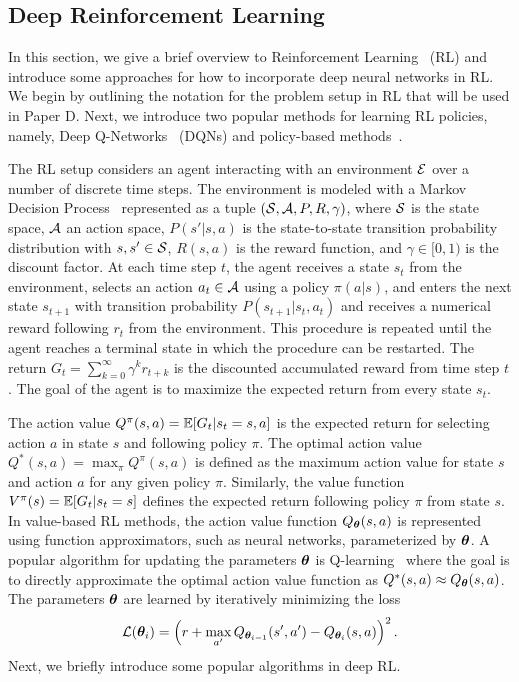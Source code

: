 \subsection{Deep Reinforcement Learning}\label{sec:deep_rl}

In this section, we give a brief overview to Reinforcement Learning~\cite{sutton2018reinforcement} (RL) and introduce some approaches for how to incorporate deep neural networks in RL. We begin by outlining the notation for the problem setup in RL that will be used in Paper D. Next, we introduce two popular methods for learning RL policies, namely, Deep Q-Networks~\cite{mnih2013playing, mnih2015human} (DQNs) and policy-based methods~\cite{mnih2016asynchronous, schulman2017proximal}. 

The RL setup considers an agent interacting with an environment ${\mathcal{E}}$ over a number of discrete time steps. The environment is modeled with a Markov Decision Process~\cite{bellman1957markovian} represented as a tuple $({\mathcal{S}}, {\mathcal{A}}, P, R, \gamma)$, where ${\mathcal{S}}$ is the state space, ${\mathcal{A}}$ an action space, $P(s' | s, a)$ is the state-to-state transition probability distribution with $s, s' \in {\mathcal{S}}$, $R(s, a)$ is the reward function, and $\gamma \in [0, 1)$ is the discount factor. At each time step $t$, the agent receives a state $s_t$ from the environment, selects an action $a_t \in {\mathcal{A}}$ using a policy $\pi(a | s)$, and enters the next state $s_{t+1}$ with transition probability $P(s_{t+1} | s_t, a_t)$ and receives a numerical reward following $r_t$ from the environment. This procedure is repeated until the agent reaches a terminal state in which the procedure can be restarted. The return $G_t = \sum_{k=0}^{\infty} \gamma^{k} r_{t+k}$ is the discounted accumulated reward from time step $t$. The goal of the agent is to maximize the expected return from every state $s_t$. 

The action value $Q^{\pi}(s, a) = \mathbb{E}[G_t | s_t=s, a]$  is the expected return for selecting action $a$ in state $s$ and following policy $\pi$. The optimal action value $Q^{*}(s, a) = \max_{\pi} Q^{\pi}(s, a)$
is defined as the maximum action value for state $s$ and action $a$ for any given policy $\pi$. Similarly,
the value function $V^{\pi}(s) = \mathbb{E}[G_t | s_t=s]$ defines the expected return following policy $\pi$ from state $s$. In value-based RL methods, the action value function $Q_{{\bm{\theta}}}(s, a)$ is represented using function approximators, such as neural networks, parameterized by ${\bm{\theta}}$. A popular algorithm for updating the parameters ${\bm{\theta}}$ is Q-learning~\cite{watkins1992q} where the goal is to directly approximate the optimal action value function as $Q^{*}(s, a) \approx Q_{{\bm{\theta}}}(s, a)$. The parameters ${\bm{\theta}}$ are learned by iteratively minimizing the loss
\begin{align}
	{\mathcal{L}}({\bm{\theta}}_i) = \left( r + \max_{a'} Q_{{\bm{\theta}}_{i-1}}(s', a') - Q_{{\bm{\theta}}_{i}}(s, a) \right)^2 .
\end{align}
Next, we briefly introduce some popular algorithms in deep RL. 

